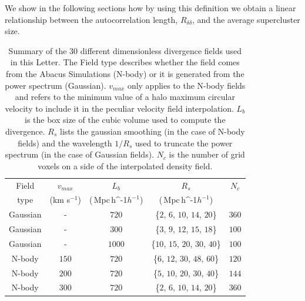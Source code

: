 \documentclass[usenatbib]{mnras}
\newcommand{\Mpch}{\,{\rm Mpc}\,\ifmmode h^{-1}\else $h^{-1}$\fi}
\begin{document}
We show in the following sections how by using this definition we obtain a linear relationship between the autocorrelation length, $R_{\delta\delta}$, and the average supercluster size.


\begin{table}
\begin{tabular}{c c c c c}\hline
Field &  $v_{max}$ & $L_b$ & $R_s$ & $N_c$\\
type & (km s$^{-1}$) & (\Mpch) & (\Mpch) & \\\hline
Gaussian & - & $720$ & \{$2$, $6$, $10$, $14$, $20$\} & $360$\\
Gaussian & - & $300$ & \{$3$, $9$, $12$, $15$, $18$\} & $100$\\
Gaussian & - & $1000$ & \{$10$, $15$, $20$, $30$, $40$\} & $100$\\
N-body & $150$ & $720$ & \{$6$, $12$, $30$, $48$, $60$\} & $120$\\
N-body & $200$ & $720$ & \{$5$, $10$, $20$, $30$, $40$\} & $144$\\
N-body & $300$ & $720$ & \{$2$, $6$, $10$, $14$, $20$\} & $360$\\\hline
\end{tabular}
\caption{Summary of the $30$ different dimensionless divergence fields used in this Letter. 
The Field type describes whether the field comes from the Abacus Simulations (N-body) or it is generated from the power spectrum (Gaussian). $v_{max}$ only applies to the N-body fields and refers to the minimum value of a halo maximum circular velocity to include it in the peculiar velocity field interpolation.
$L_b$ is the box size of the cubic volume used to compute the divergence. $R_{s}$ lists the gaussian smoothing (in the case of N-body fields) and the wavelength $1/R_s$ used to truncate the power spectrum (in the case of Gaussian fields). $N_c$ is the number of grid voxels on a side of the interpolated density field.}
\label{table:values}
\end{table}
\end{document}

